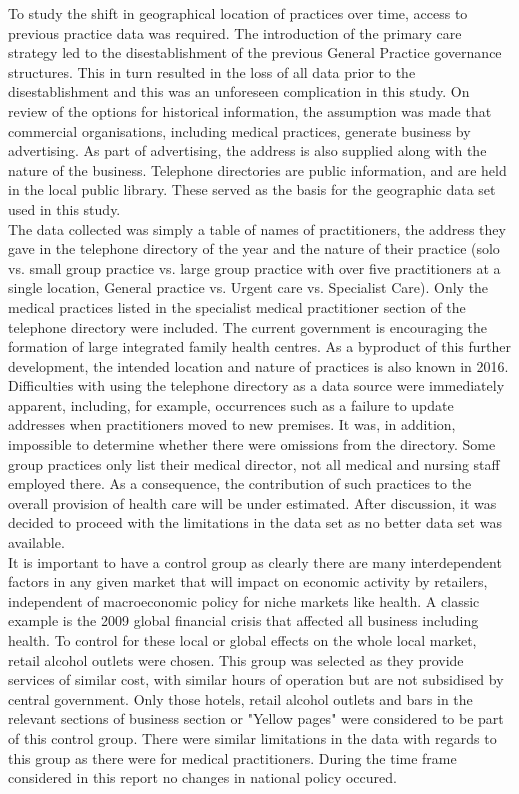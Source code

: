 \documentclass[11pt,a4paper]{article}
\begin{document}
To study the shift in geographical location of practices over time, access to previous practice data was required. The introduction of the primary care strategy led to the disestablishment of the previous General Practice governance structures. This in turn resulted in the loss of all data prior to the disestablishment and this was an unforeseen complication in this study. On review of the options for historical information, the assumption was made that commercial organisations, including medical practices, generate business by advertising. As part of advertising, the address is also supplied along with the nature of the business. Telephone directories are public information, and are held in the local public library. These served as the basis for the geographic data set used in this study.\\

The data collected was simply a table of names of practitioners, the address they gave in the telephone directory of the year and the nature of their practice (solo vs. small group practice vs. large group practice with over five practitioners at a single location,  General practice vs. Urgent care vs. Specialist Care). Only the  medical practices listed in the specialist medical practitioner section of the telephone directory were included. The current government is encouraging the formation of large integrated family health centres. As a byproduct of this further development, the intended location and nature of practices is also known in 2016.\\

Difficulties with using the telephone directory as a data source were immediately apparent, including, for example, occurrences such as a failure to update addresses when practitioners moved to new premises. It was, in addition,  impossible to determine whether there were omissions from the directory. Some group practices only list their medical director, not all medical and nursing staff employed there. As a consequence, the contribution of such practices to the overall provision of health care will be under estimated.  After discussion, it was decided to proceed with the limitations in the data set as no better data set was available.  \\

It is important to have a control group as clearly there are many interdependent factors in any given market that will impact on economic activity by retailers, independent of macroeconomic policy for niche markets like health. A classic example is the 2009 global financial crisis that affected all business including health. To control for these local or global effects on the whole local market, retail alcohol outlets were chosen.  This group was selected as they provide services of similar cost, with similar hours of operation but are not subsidised by central government. Only those hotels, retail alcohol outlets and bars in the relevant sections of business section or "Yellow pages" were considered to be part of this control group. There were similar limitations in the data with regards to this group as there were for medical practitioners. During the time frame considered in this report no changes in national policy occured.\\
\end{document}
